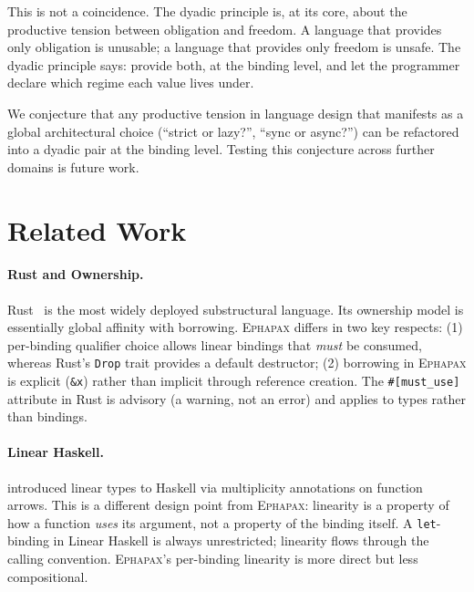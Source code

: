 \documentclass[11pt,a4paper]{article}
\newcommand{\Ephapax}{\textsc{Ephapax}}
\begin{document}
This is not a coincidence. The dyadic principle is, at its core, about the
productive tension between obligation and freedom. A language that provides
only obligation is unusable; a language that provides only freedom is unsafe.
The dyadic principle says: provide both, at the binding level, and let the
programmer declare which regime each value lives under.

We conjecture that any productive tension in language design that manifests as
a global architectural choice (``strict or lazy?'', ``sync or async?'') can be
refactored into a dyadic pair at the binding level. Testing this conjecture
across further domains is future work.

\section{Related Work}
\label{sec:related-work}

\paragraph{Rust and Ownership.}
Rust~\citep{jung2018rustbelt} is the most widely deployed substructural
language. Its ownership model is essentially global affinity with borrowing.
\Ephapax{} differs in two key respects: (1) per-binding qualifier choice allows
linear bindings that \emph{must} be consumed, whereas Rust's \lstinline{Drop}
trait provides a default destructor; (2) borrowing in \Ephapax{} is explicit
(\lstinline{&x}) rather than implicit through reference creation. The
\lstinline{#[must_use]} attribute in Rust is advisory (a warning, not an error)
and applies to types rather than bindings.

\paragraph{Linear Haskell.}
\citet{bernardy2018linear} introduced linear types to Haskell via multiplicity
annotations on function arrows. This is a different design point from \Ephapax{}:
linearity is a property of how a function \emph{uses} its argument, not a
property of the binding itself. A \lstinline{let}-binding in Linear Haskell is
always unrestricted; linearity flows through the calling convention. \Ephapax{}'s
per-binding linearity is more direct but less compositional.
\end{document}
